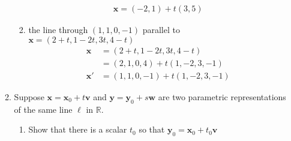 \documentclass[letterpaper]{article}
\begin{document}
\begin{enumerate}
\begin{enumerate}
\begin{enumerate}
    \begin{align*}
      \mathbf{x}=(-2,1)+t(3,5)
    \end{align*}
    \setcounter{enumiii}{7}
    \item
    the line through $(1, 1, 0, -1)$ parallel to $\mathbf{x}=(2+t,1-2t,3t,4-t)$
    \begin{align*}
      \mathbf{x}&=(2+t,1-2t,3t,4-t)\\
      &=(2,1,0,4)+t(1,-2,3,-1)\\
      \mathbf{x}'&=(1,1,0,-1)+t(1,-2,3,-1)
    \end{align*}
    \end{enumerate}
  \item
  Suppose $\mathbf{x}=\mathbf{x}_0+t\mathbf{v}$ and $\mathbf{y}=\mathbf{y}_0+s\mathbf{w}$ are two parametric representations of the same line $\ell$ in $\mathbb{R}$.
    \begin{enumerate}
    \item
    Show that there is a scalar $t_0$ so that $\mathbf{y}_0=\mathbf{x}_0+t_0\mathbf{v}$


\end{enumerate}
\end{enumerate}
\end{enumerate}
\end{document}
